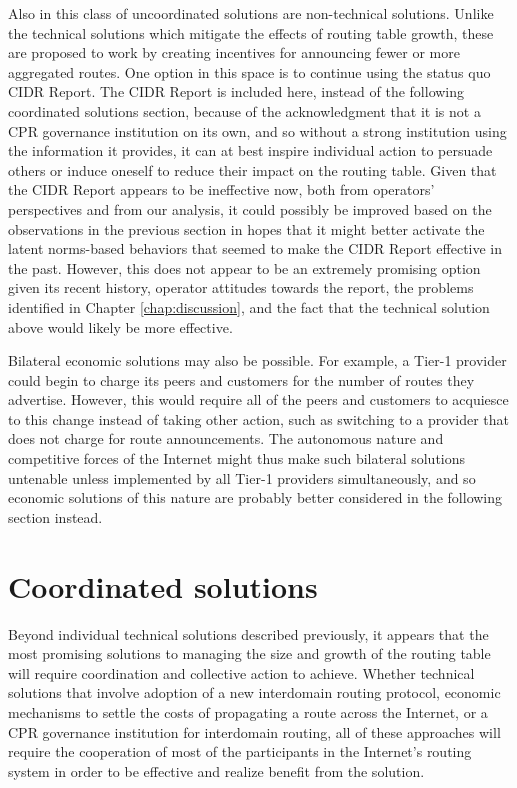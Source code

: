 Also in this class of uncoordinated solutions are non-technical solutions.
Unlike the technical solutions which mitigate the effects of routing table
growth, these are proposed to work by creating incentives for announcing fewer
or more aggregated routes. One option in this space is to continue using the
status quo CIDR Report. The CIDR Report is included here, instead of the
following coordinated solutions section, because of the acknowledgment that it
is not a CPR governance institution on its own, and so without a strong
institution using the information it provides, it can at best inspire
individual action to persuade others or induce oneself to reduce their impact
on the routing table. Given that the CIDR Report appears to be ineffective now,
both from operators' perspectives and from our analysis, it could possibly be
improved based on the observations in the previous section in hopes that it
might better activate the latent norms-based behaviors that seemed to make the
CIDR Report effective in the past. However, this does not appear to be an
extremely promising option given its recent history, operator attitudes towards
the report, the problems identified in Chapter \ref{chap:discussion}, and the
fact that the technical solution above would likely be more effective.

Bilateral economic solutions may also be possible. For example, a Tier-1
provider could begin to charge its peers and customers for the number of routes
they advertise. However, this would require all of the peers and customers to
acquiesce to this change instead of taking other action, such as switching
to a provider that does not charge for route announcements. The autonomous
nature and competitive forces of the Internet might thus make such bilateral
solutions untenable unless implemented by all Tier-1 providers simultaneously,
and so economic solutions of this nature are probably better considered in the
following section instead.

\section{Coordinated solutions}
Beyond individual technical solutions described previously, it appears that the
most promising solutions to managing the size and growth of the routing table
will require coordination and collective action to achieve. Whether technical
solutions that involve adoption of a new interdomain routing protocol, economic
mechanisms to settle the costs of propagating a route across the Internet, or
a CPR governance institution for interdomain routing, all of these approaches
will require the cooperation of most of the participants in the Internet's
routing system in order to be effective and realize benefit from the solution.

